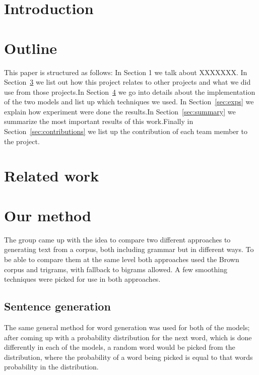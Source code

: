\documentclass[a4paper,12pt]{article}
\begin{document}
\section{Introduction} %
\label{sec:intro}





\section{Outline}
This paper is structured as follows: In Section 1 we talk about XXXXXXX. In Section~\ref{sec:relwork} we list out how this project relates to other projects and what we did use from those projects.In Section~\ref{sec:method} we go into details about the implementation of the two models and list up which techniques we used. In Section~\ref{sec:exps} we explain how experiment were done the results.In Section~\ref{sec:summary} we summarize the most important results of this work.Finally in Section~\ref{sec:contributions} we list up the contribution of each team member to the project.

\section{Related work}
\label{sec:relwork}



\section{Our method}
\label{sec:method}

The group came up with the idea to compare two different approaches to generating text from a corpus, both including grammar but in different ways. To be able to compare them at the same level both approaches used the Brown corpus and trigrams, with fallback to bigrams allowed. A few smoothing techniques were picked for use in both approaches.

\subsection{Sentence generation}
The same general method for word generation was used for both of the models; after coming up with a probability distribution for the next word, which is done differently in each of the models, a random word would be picked from the distribution, where the probability of a word being picked is equal to that words probability in the distribution.
\end{document}
